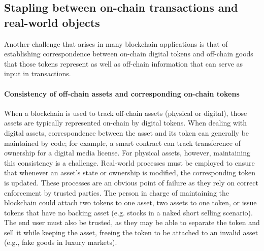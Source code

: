 
\subsection{Stapling between on-chain transactions and real-world objects}
Another challenge that arises in many blockchain applications is that of establishing correspondence between on-chain digital tokens and off-chain goods that those tokens represent as well as off-chain information that can serve as input in transactions.  

\paragraph{Consistency of off-chain assets and corresponding on-chain tokens}
When a blockchain is used to track off-chain assets (physical or digital), those assets are typically represented on-chain by digital tokens. When dealing with digital assets, correspondence between the asset and its token can generally be maintained by code; for example, a smart contract can track transference of ownership for a digital media license. For physical assets, however, maintaining this consistency is a challenge. Real-world processes must be employed to ensure that whenever an asset's state or ownership is modified, the corresponding token is updated. These processes are an obvious point of failure as they rely on correct enforcement by trusted parties. The person in charge of maintaining the blockchain could attach two tokens to one asset, two assets to one token, or issue tokens that have no backing asset (e.g. stocks in a naked short selling scenario). The end user must also be trusted, as they may be able to separate the token and sell it while keeping the asset, freeing the token to be attached to an invalid asset (e.g., fake goods in luxury markets). 




